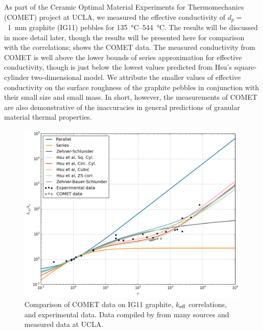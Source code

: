 As part of the Ceramic Optimal Material Experiments for Thermomechanics (COMET) project at UCLA, we measured the effective conductivity of $d_p = $~\SI{1}{\milli\meter} graphite (IG11) pebbles for \SIrange{135}{544}{\celsius}. The results will be discussed in more detail later, though the results will be presented here for comparison with the correlations;  shows the COMET data. The measured conductivity from COMET is well above the lower bounds of series approximation for effective conductivity, though is just below the lowest values predicted from Hsu\etal's square-cylinder two-dimensional model. We attribute the smaller values of effective conductivity on the surface roughness of the graphite pebbles in conjunction with their small size and small mass. In short, however, the measurements of COMET are also demonstrative of the inaccuracies in general predictions of granular material thermal properties.

\begin{figure}[ht]
    \centering
    \includegraphics[width=\textwidth]{figures/keff-kappa-experimental-comet}
    \caption{Comparison of COMET data on IG11 graphite, $k_\text{eff}$ correlations, and experimental data. Data compiled by \cite{VanAntwerpen2010} from many sources and measured data at UCLA.}
    \label{fig:kappa-experimental-comet}
\end{figure}












